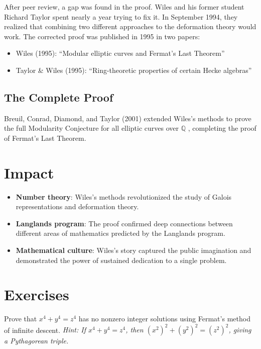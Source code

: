 After peer review, a gap was found in the proof. Wiles and his former student Richard Taylor spent nearly a year trying to fix it. In September 1994, they realized that combining two different approaches to the deformation theory would work. The corrected proof was published in 1995 in two papers:

\begin{itemize}
\item Wiles (1995): ``Modular elliptic curves and Fermat's Last Theorem'' \cite{wiles1995}
\item Taylor \& Wiles (1995): ``Ring-theoretic properties of certain Hecke algebras'' \cite{taylorwiles1995}
\end{itemize}

\subsection{The Complete Proof}

Breuil, Conrad, Diamond, and Taylor (2001) extended Wiles's methods to prove the full Modularity Conjecture for all elliptic curves over $\mathbb{Q}$ \cite{bcdt2001}, completing the proof of Fermat's Last Theorem.

\section{Impact}

\begin{itemize}
\item \textbf{Number theory}: Wiles's methods revolutionized the study of Galois representations and deformation theory.
\item \textbf{Langlands program}: The proof confirmed deep connections between different areas of mathematics predicted by the Langlands program.
\item \textbf{Mathematical culture}: Wiles's story captured the public imagination and demonstrated the power of sustained dedication to a single problem.
\end{itemize}

\section{Exercises}

\begin{exercise}[Basic]
Prove that $x^4 + y^4 = z^4$ has no nonzero integer solutions using Fermat's method of infinite descent. \emph{Hint: If $x^4 + y^4 = z^4$, then $(x^2)^2 + (y^2)^2 = (z^2)^2$, giving a Pythagorean triple.}
\end{exercise}

